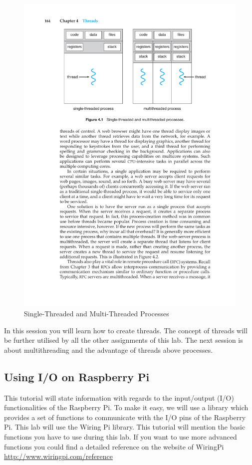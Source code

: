 \begin{figure}
  \centering
  \includegraphics[width=.8\textwidth]{images/thread.pdf}
\caption{Single-Threaded and Multi-Threaded Processes}
\label{fig:thread}
\end{figure}

In this session you will learn how to create threads. The concept of threads will be further utilised by all the other assignments of this lab. The next session is about multithreading and the advantage of threads above processes.

\subsection*{Using I/O on Raspberry Pi}\label{sec:io-intro}
This tutorial will state information with regards to the input/output (I/O) functionalities of the Raspberry Pi. To make it easy, we will use a library which provides a set of functions to communicate with the I/O pins of the Raspberry Pi. This lab will use the Wiring Pi library. This tutorial will mention the basic functions you have to use during this lab. If you want to use more advanced functions you could find a detailed reference on the website of WiringPi \url{http://www.wiringpi.com/reference}

